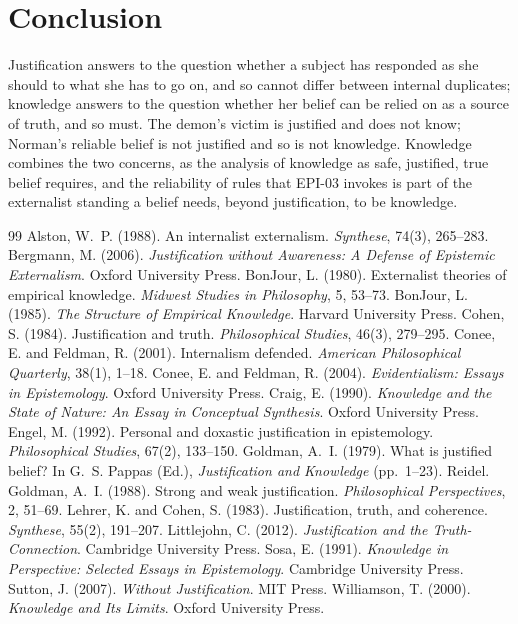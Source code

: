 \documentclass{situationist-preprint}
\begin{document}
\section{Conclusion}

Justification answers to the question whether a subject has responded as she should to what she has to go on, and so cannot differ between internal duplicates; knowledge answers to the question whether her belief can be relied on as a source of truth, and so must. The demon's victim is justified and does not know; Norman's reliable belief is not justified and so is not knowledge. Knowledge combines the two concerns, as the analysis of knowledge as safe, justified, true belief requires, and the reliability of rules that EPI-03 invokes is part of the externalist standing a belief needs, beyond justification, to be knowledge.

\begin{thebibliography}{99}\small
{} Alston, W.~P. (1988). An internalist externalism. \emph{Synthese}, 74(3), 265--283.
 Bergmann, M. (2006). \emph{Justification without Awareness: A Defense of Epistemic Externalism}. Oxford University Press.
 BonJour, L. (1980). Externalist theories of empirical knowledge. \emph{Midwest Studies in Philosophy}, 5, 53--73.
 BonJour, L. (1985). \emph{The Structure of Empirical Knowledge}. Harvard University Press.
 Cohen, S. (1984). Justification and truth. \emph{Philosophical Studies}, 46(3), 279--295.
 Conee, E. and Feldman, R. (2001). Internalism defended. \emph{American Philosophical Quarterly}, 38(1), 1--18.
 Conee, E. and Feldman, R. (2004). \emph{Evidentialism: Essays in Epistemology}. Oxford University Press.
 Craig, E. (1990). \emph{Knowledge and the State of Nature: An Essay in Conceptual Synthesis}. Oxford University Press.
 Engel, M. (1992). Personal and doxastic justification in epistemology. \emph{Philosophical Studies}, 67(2), 133--150.
 Goldman, A.~I. (1979). What is justified belief? In G.~S. Pappas (Ed.), \emph{Justification and Knowledge} (pp.~1--23). Reidel.
 Goldman, A.~I. (1988). Strong and weak justification. \emph{Philosophical Perspectives}, 2, 51--69.
 Lehrer, K. and Cohen, S. (1983). Justification, truth, and coherence. \emph{Synthese}, 55(2), 191--207.
 Littlejohn, C. (2012). \emph{Justification and the Truth-Connection}. Cambridge University Press.
 Sosa, E. (1991). \emph{Knowledge in Perspective: Selected Essays in Epistemology}. Cambridge University Press.
 Sutton, J. (2007). \emph{Without Justification}. MIT Press.
 Williamson, T. (2000). \emph{Knowledge and Its Limits}. Oxford University Press.
\end{thebibliography}
\end{document}
